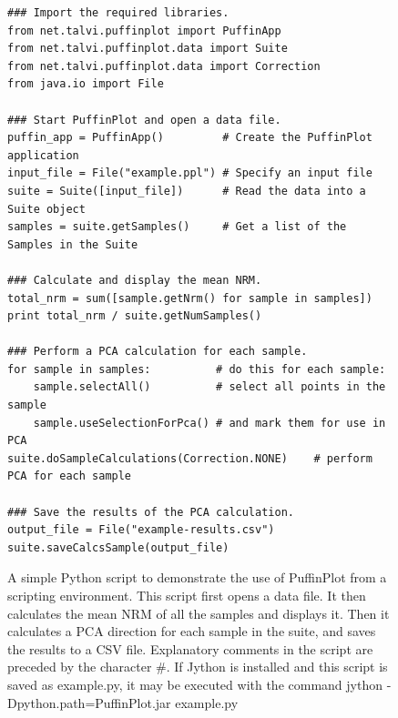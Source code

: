 \documentclass[a4paper,british]{article}
\newcommand{\ppcmd}[1]{\textsf{#1}} %
\newcommand{\caps}[1]{\MakeTextUppercase{#1}} %
\begin{document}
\begin{figure}
  \caption{\label{fig:script-example-1}A simple Python script to demonstrate
    the use of PuffinPlot from a scripting environment. This script first
    opens a data file. It then calculates the mean \caps{nrm} of all the
    samples and displays it. Then it calculates a \caps{pca} direction for
    each sample in the suite, and saves the results to a \caps{csv} file.
    Explanatory comments in the script are preceded by the character \#. If
    Jython is installed and this script is saved as \ppcmd{example.py}, it
    may be executed with the command \ppcmd{jython
      -Dpython.path=PuffinPlot.jar example.py}}
  \lstset{language=Python}
\begin{lstlisting}
### Import the required libraries.
from net.talvi.puffinplot import PuffinApp
from net.talvi.puffinplot.data import Suite
from net.talvi.puffinplot.data import Correction
from java.io import File

### Start PuffinPlot and open a data file.
puffin_app = PuffinApp()         # Create the PuffinPlot application
input_file = File("example.ppl") # Specify an input file
suite = Suite([input_file])      # Read the data into a Suite object
samples = suite.getSamples()     # Get a list of the Samples in the Suite

### Calculate and display the mean NRM.
total_nrm = sum([sample.getNrm() for sample in samples])
print total_nrm / suite.getNumSamples()

### Perform a PCA calculation for each sample.
for sample in samples:          # do this for each sample:
    sample.selectAll()          # select all points in the sample
    sample.useSelectionForPca() # and mark them for use in PCA
suite.doSampleCalculations(Correction.NONE)    # perform PCA for each sample

### Save the results of the PCA calculation.
output_file = File("example-results.csv")
suite.saveCalcsSample(output_file)
\end{lstlisting}
\end{figure}
\end{document}

